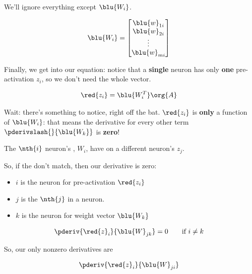         We'll ignore everything except $\blu{W_i}$.
        
        \begin{equation}
            \blu{W_i} = 
            \begin{bmatrix}
                \blu{w}_{1i} \\ \blu{w}_{2i} \\ \vdots \\ \blu{w}_{mi}
            \end{bmatrix}
        \end{equation}
        
        Finally, we get into our equation: notice that a \textbf{single} neuron has only \textbf{one} pre-activation $z_i$, so we don't need the whole vector.
        
        \begin{equation}
            \red{z_i} = \blu{W_i^T}\org{A}
        \end{equation}
        
        Wait: there's something to notice, right off the bat. $\red{z_i}$ is \textbf{only} a function of $\blu{W_i}$: that means the derivative for every other term $\pderivslash{}{\blu{W_k}}$ is \textbf{zero}!
            \\
        
        \begin{concept}
            The $\nth{i}$ neuron's , $W_i$, have  on a different neuron's  $z_j$.
            
            So, if the  don't match, then our derivative is zero:
            
            \begin{itemize}
                \item $i$ is the neuron for pre-activation $\red{z_i}$
                \item $j$ is the $\nth{j}$  in a neuron.
                \item $k$ is the neuron for weight vector $\blu{W_k}$
            \end{itemize}
            
            \begin{equation*}
                \pderiv{ \red{z}_i }{ \blu{W}_{jk} } = 0 
                \qquad
                \text{if } i \neq k
            \end{equation*}
            
            So, our only nonzero derivatives are
            
            \begin{equation*}
                \pderiv{ \red{z}_i }{ \blu{W}_{ji} }
            \end{equation*}
        \end{concept}
        
